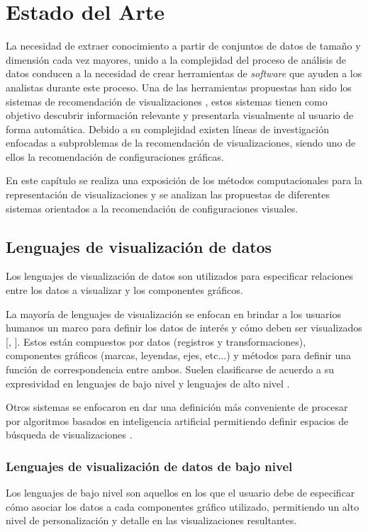 \chapter{Estado del Arte}\label{chapter:state-of-the-art}

La necesidad de extraer conocimiento a partir de conjuntos de datos
de tama\~no y dimensi\'on cada vez mayores, unido a la complejidad del
proceso de an\'alisis de datos conducen a la necesidad de crear herramientas
de \textit{software} que ayuden a los analistas durante este proceso.
Una de las herramientas propuestas han sido los sistemas de recomendaci\'on de visualizaciones \cite{vartak2017towards}, 
estos sistemas tienen como objetivo descubrir informaci\'on relevante y presentarla visualmente
al usuario de forma autom\'atica. Debido a su complejidad existen l\'ineas de investigaci\'on
enfocadas a subproblemas de la recomendaci\'on de visualizaciones, siendo uno de ellos
la recomendaci\'on de configuraciones gr\'aficas.

En este cap\'itulo se realiza una exposici\'on de los m\'etodos computacionales para la representaci\'on 
de visualizaciones y se analizan las propuestas de diferentes sistemas orientados a la
recomendaci\'on de configuraciones visuales.


\section{Lenguajes de visualizaci\'on de datos}
Los lenguajes de visualizaci\'on de datos son utilizados para especificar
relaciones entre los datos a visualizar y los componentes gr\'aficos.

La mayor\'ia de lenguajes de visualizaci\'on se enfocan en brindar a los usuarios humanos
un marco para definir los datos de inter\'es y c\'omo deben ser visualizados [\cite*{li2018echarts}, \cite*{tableau}]. 
Estos est\'an compuestos por datos (registros y transformaciones), 
componentes gr\'aficos (marcas, leyendas, ejes, etc...) y
m\'etodos para definir una funci\'on de correspondencia entre ambos. Suelen clasificarse
de acuerdo a su expresividad en lenguajes de bajo nivel y lenguajes de alto nivel \cite{qin2020making}.

Otros sistemas se enfocaron en dar una definici\'on m\'as conveniente de procesar
por algoritmos basados en inteligencia artificial permitiendo definir espacios de b\'usqueda de
visualizaciones \cite{godfrey2016interactive}.


\subsection{Lenguajes de visualizaci\'on de datos de bajo nivel}
Los lenguajes de bajo nivel son aquellos en los que el usuario debe de especificar c\'omo asociar los
datos a cada componentes gr\'afico utilizado, permitiendo un alto nivel de personalizaci\'on y detalle en
las visualizaciones resultantes.

